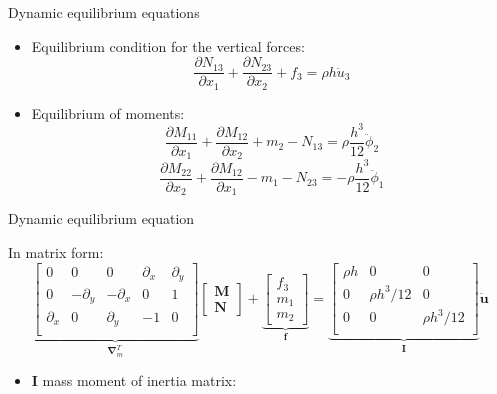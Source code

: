 \documentclass[aspectratio=169]{beamer}
\begin{document}
\begin{frame}{Dynamic equilibrium equations}
  \begin{itemize}
    \item Equilibrium condition for the vertical forces:
          $$\frac{\partial N_{13}}{\partial x_1}+\frac{\partial N_{23}}{\partial x_2}+f_3=\rho h \ddot{u}_3$$
    \item Equilibrium of moments:
          $$\frac{\partial M_{11}}{\partial x_1}+\frac{\partial M_{12}}{\partial x_2}+m_2-N_{13}=\rho \frac{h^3}{12} \ddot{\phi}_2$$
          $$\frac{\partial M_{22}}{\partial x_2}+\frac{\partial M_{12}}{\partial x_1}-m_1-N_{23}=-\rho \frac{h^3}{12} \ddot{\phi}_1$$
  \end{itemize}
\end{frame}

\begin{frame}{Dynamic equilibrium equation}
  \begin{block}{}
    In matrix form:
    $$\underbrace{\begin{bmatrix}
          0          & 0           & 0           & \partial_x & \partial_y \\
          0          & -\partial_y & -\partial_x & 0          & 1          \\
          \partial_x & 0           & \partial_y  & -1         & 0          \\
        \end{bmatrix}}_\text{$\boldsymbol\nabla_m^T$} \begin{bmatrix}
        \mathbf{M} \\ \mathbf{N}
      \end{bmatrix}+\underbrace{\begin{bmatrix}
          f_3 \\ m_1 \\ m_2
        \end{bmatrix}}_\text{$\mathbf f$}=\underbrace{\begin{bmatrix}
          \rho h & 0           & 0           \\
          0      & \rho h^3/12 & 0           \\
          0      & 0           & \rho h^3/12 \\
        \end{bmatrix}}_\text{$\mathbf I$} \ddot{\mathbf{u}}$$
    \vspace{-0.3cm}
    \begin{itemize}
      \item  $\mathbf I$ mass moment of inertia matrix:

\end{itemize}
\end{block}
\end{frame}
\end{document}
